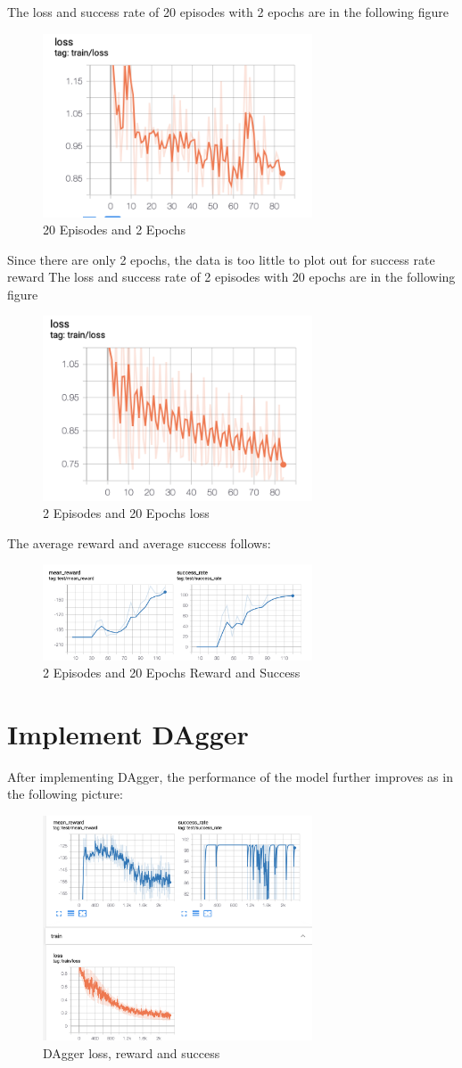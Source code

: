 \documentclass{article}
\begin{document}
The loss and success rate of 20 episodes with 2 epochs are in the following figure
		\begin{figure}[H]
			\caption{20 Episodes and 2 Epochs}
			\centering
			\includegraphics[width=8cm]{lossinit20ep2.png}
		\end{figure}
Since there are only 2 epochs, the data is too little to plot out for success rate reward
The loss and success rate of 2 episodes with 20 epochs are in the following figure
		\begin{figure}[H]
			\caption{2 Episodes and 20 Epochs loss}
			\centering
			\includegraphics[width=8cm]{vanillainit2ep20.png}
		\end{figure}
The average reward and average success follows:
		\begin{figure}[H]
			\caption{2 Episodes and 20 Epochs Reward and Success}
			\centering
			\includegraphics[width=8cm]{rewardinit2ep20.png}
		\end{figure}
\section{Implement DAgger}
After implementing DAgger, the performance of the model further improves as in the following picture:
		\begin{figure}[H]
			\caption{DAgger loss, reward and success}
			\centering
			\includegraphics[width=8cm]{Dagger.png}
		\end{figure}
\end{document}
